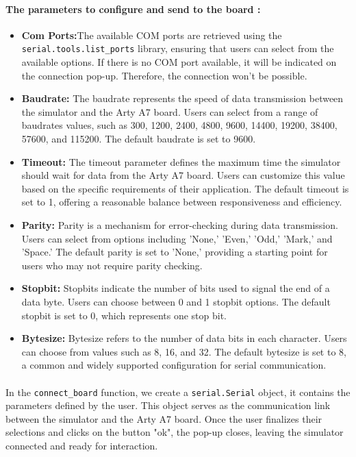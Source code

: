 \documentclass{article}
\begin{document}
\paragraph{The parameters to configure and send to the board :}
 \begin{itemize}
    \item \textbf{Com Ports:}The available COM ports are retrieved using the \texttt{serial.tools.list\_ports} library, ensuring that users can select from the available options. If there is no COM port available, it will be indicated on the connection pop-up. Therefore, the connection won't be possible.

    \item \textbf{Baudrate:} The baudrate represents the speed of data transmission between the simulator and the Arty A7 board. Users can select from a range of baudrates values, such as 300, 1200, 2400, 4800, 9600, 14400, 19200, 38400, 57600, and 115200. The default baudrate is set to 9600.

    \item \textbf{Timeout:} The timeout parameter defines the maximum time the simulator should wait for data from the Arty A7 board. Users can customize this value based on the specific requirements of their application. The default timeout is set to 1, offering a reasonable balance between responsiveness and efficiency.

    \item \textbf{Parity:} Parity is a mechanism for error-checking during data transmission. Users can select from options including 'None,' 'Even,' 'Odd,' 'Mark,' and 'Space.' The default parity is set to 'None,' providing a starting point for users who may not require parity checking.

    \item \textbf{Stopbit:} Stopbits indicate the number of bits used to signal the end of a data byte. Users can choose between 0 and 1 stopbit options. The default stopbit is set to 0, which represents one stop bit.

    \item \textbf{Bytesize:} Bytesize refers to the number of data bits in each character. Users can choose from values such as 8, 16, and 32. The default bytesize is set to 8, a common and widely supported configuration for serial communication.

\end{itemize}


\paragraph{}In the \texttt{connect\_board} function, we create a \texttt{serial.Serial} object, it contains the parameters defined by the user. This object serves as the communication link between the simulator and the Arty A7 board. Once the user finalizes their selections and clicks on the button "ok", the pop-up closes, leaving the simulator connected and ready for interaction.
\end{document}
